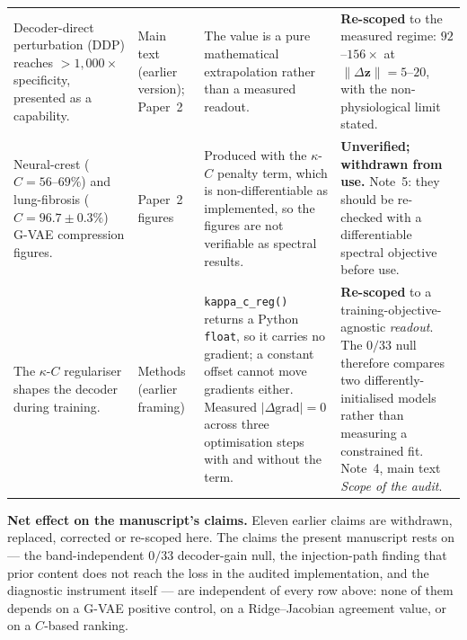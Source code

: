 \documentclass[11pt,a4paper]{article}
\begin{document}
\begin{tabular}{@{}p{} p{} p{} p{}@{}}
Decoder-direct perturbation (DDP) reaches $>1{,}000\times$ specificity, presented as a capability.
&
Main text (earlier version); Paper~2
&
The value is a pure mathematical extrapolation rather than a measured readout.
&
\textbf{Re-scoped} to the measured regime: $92$--$156\times$ at
$\|\Delta\mathbf{z}\|=5$--$20$, with the non-physiological limit stated. \\

Neural-crest ($C=56$--$69\%$) and lung-fibrosis ($C=96.7\pm0.3\%$) G-VAE compression figures.
&
Paper~2 figures
&
Produced with the $\kappa$-$C$ penalty term, which is non-differentiable as implemented, so the
figures are not verifiable as spectral results.
&
\textbf{Unverified; withdrawn from use.} Note~5: they should be re-checked with a differentiable
spectral objective before use. \\

The $\kappa$-$C$ regulariser shapes the decoder during training.
&
Methods (earlier framing)
&
\texttt{kappa\_c\_reg()} returns a Python \texttt{float}, so it carries no gradient; a constant
offset cannot move gradients either. Measured $|\Delta\text{grad}|=0$ across three optimisation
steps with and without the term.
&
\textbf{Re-scoped} to a training-objective-agnostic \emph{readout}. The $0/33$ null therefore
compares two differently-initialised models rather than measuring a constrained fit. Note~4,
main text \emph{Scope of the audit}. \\

\bottomrule
\end{tabular}

\vspace{6pt}
\footnotesize\noindent
\textbf{Net effect on the manuscript's claims.} Eleven earlier claims are withdrawn, replaced,
corrected or re-scoped here. The claims the present manuscript rests on --- the band-independent
$0/33$ decoder-gain null, the injection-path finding that prior content does not reach the loss in
the audited implementation, and the diagnostic instrument itself --- are independent of every row
above: none of them depends on a G-VAE positive control, on a Ridge--Jacobian agreement value, or
on a $C$-based ranking.
\end{document}
